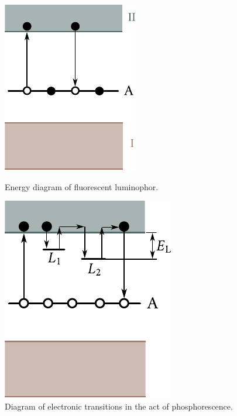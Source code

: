 \begin{figure}[!t]
	\begin{minipage}[t]{0.48\linewidth}
		\begin{center}
			\includegraphics[scale=1.18]{figures/ch_06/fig_6_24.pdf}
			\caption[]{Energy diagram of fluorescent luminophor.}
			\label{fig:6_24}
		\end{center}
	\end{minipage}
	\hfill{ }%
	\begin{minipage}[t]{0.48\linewidth}
		\begin{center}
			\includegraphics[scale=0.98]{figures/ch_06/fig_6_25.pdf}
			\caption[]{Diagram of electronic transitions in the act of phosphorescence.}
			\label{fig:6_25}
		\end{center}
	\end{minipage}
\vspace{-0.3cm}
\end{figure}

